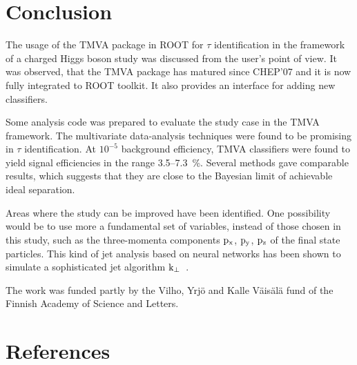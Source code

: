 \documentclass[a4paper]{jpconf}
\begin{document}
\section{Conclusion}
The usage of the TMVA package in ROOT for $\tau$ identification in the
framework of a charged Higgs boson study was discussed from the  user's point of view. 
It was observed, that the TMVA package has
matured since CHEP'07 and it is now fully integrated to ROOT toolkit. 
It also provides an interface for adding new classifiers.

Some analysis code was prepared to evaluate the study case in the TMVA framework. 
The multivariate data-analysis techniques were found to be promising in $\tau$ identification.
At $10^{-5}$ background efficiency, 
TMVA classifiers were found to yield signal efficiencies in the range 3.5--7.3~\%.
Several methods gave comparable results, 
which suggests that they are close to the Bayesian limit of achievable ideal separation.

Areas where the study can be improved have been identified.
One possibility would be to use more a fundamental set of variables, 
instead of those chosen in this study, 
such as the three-momenta components ${\rm p_x}$, ${\rm p_y}$, ${\rm p_z}$ of the final state particles. 
This kind of jet analysis based on neural networks has been shown to simulate a sophisticated 
jet algorithm ${\rm k_\bot}$~\cite{jetanalysis}.

\ack %
The work was funded partly by the 
Vilho, Yrj\"o and Kalle V\"ais\"al\"a fund of the Finnish Academy of Science and Letters.

\section*{References}
\end{document}
